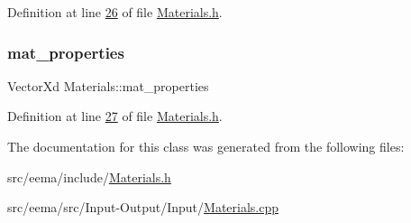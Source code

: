 Definition at line \hyperlink{_materials_8h_source_l00026}{26} of file \hyperlink{_materials_8h_source}{Materials.\+h}.

\mbox{\label{class_materials_af663f6cf518ba3f857bac40a1e33eac0}} 
\subsubsection{\texorpdfstring{mat\+\_\+properties}{mat\_properties}}
{\footnotesize\ttfamily Vector\+Xd Materials\+::mat\+\_\+properties\hspace{0.3cm}{\ttfamily [private]}}



Definition at line \hyperlink{_materials_8h_source_l00027}{27} of file \hyperlink{_materials_8h_source}{Materials.\+h}.



The documentation for this class was generated from the following files\+:\begin{DoxyCompactItemize}
\item 
src/eema/include/\hyperlink{_materials_8h}{Materials.\+h}\item 
src/eema/src/\+Input-\/\+Output/\+Input/\hyperlink{_materials_8cpp}{Materials.\+cpp}\end{DoxyCompactItemize}
